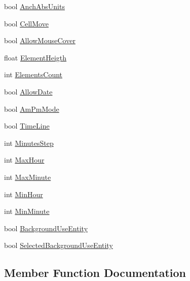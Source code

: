 \begin{DoxyCompactItemize}
\item 
bool \hyperlink{class_n_g_u_i_time_selector_a4cde5696d5267c27e7b3f2c22d316b3f}{Anch\+Abs\+Units}
\item 
bool \hyperlink{class_n_g_u_i_time_selector_a346ebc14fa0d2ae6312fb8189bb714d7}{Cell\+Move}
\item 
bool \hyperlink{class_n_g_u_i_time_selector_ab8beb867f18b54b3705672773f5a6a48}{Allow\+Mouse\+Cover}
\item 
float \hyperlink{class_n_g_u_i_time_selector_a40b3c2697de2d6964314191c33daf69d}{Element\+Heigth}
\item 
int \hyperlink{class_n_g_u_i_time_selector_a02ea87ac537befc28431cd919c360a5a}{Elements\+Count}
\item 
bool \hyperlink{class_n_g_u_i_time_selector_a055a7175ebffba2b2731f2f36eb6023e}{Allow\+Date}
\item 
bool \hyperlink{class_n_g_u_i_time_selector_a303e47574385003af078102a9f569c5d}{Am\+Pm\+Mode}
\item 
bool \hyperlink{class_n_g_u_i_time_selector_aca01f7fc5adc3e6790d7382bb31d7758}{Time\+Line}
\item 
int \hyperlink{class_n_g_u_i_time_selector_a68703eb8f78bfa19adeb79a806619570}{Minutes\+Step}
\item 
int \hyperlink{class_n_g_u_i_time_selector_a40825ca76ba9945f683f5348ee7fed49}{Max\+Hour}
\item 
int \hyperlink{class_n_g_u_i_time_selector_a0f26e25a913343aa02e65026ad953740}{Max\+Minute}
\item 
int \hyperlink{class_n_g_u_i_time_selector_a2e4184ae5e016448a1cf246cac9f579b}{Min\+Hour}
\item 
int \hyperlink{class_n_g_u_i_time_selector_ad5bd09124a7d9e85adf999e9d9de1349}{Min\+Minute}
\item 
bool \hyperlink{class_n_g_u_i_time_selector_a046b19209395a3b1bf3be099978b7998}{Background\+Use\+Entity}
\item 
bool \hyperlink{class_n_g_u_i_time_selector_a40c48442ec834605b0d4dcc61d2705c9}{Selected\+Background\+Use\+Entity}
\end{DoxyCompactItemize}


\subsection{Member Function Documentation}
\hypertarget{class_n_g_u_i_time_selector_aea93f854ce5ee0e29c81abfbe6f8d7e8}{}\label{class_n_g_u_i_time_selector_aea93f854ce5ee0e29c81abfbe6f8d7e8} 
